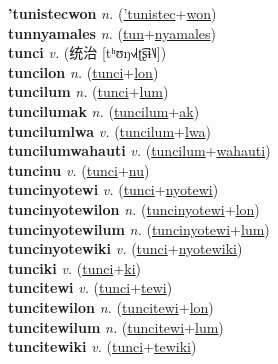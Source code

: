 \textbf{'tunistecwon} \textit{n.} (\hyperref['tunistec]{'tunistec}+\hyperref[won]{won})
 \label{'tunistecwon} \\
\textbf{tunnyamales} \textit{n.} (\hyperref[tun]{tun}+\hyperref[nyamales]{nyamales})
 \label{tunnyamales} \\
\textbf{tunci} \textit{v.} ({\chinese{}统治} [tʰʊŋ˧˩˧ʈ͡ʂɨ˥˩])
 \label{tunci} \\
\textbf{tuncilon} \textit{n.} (\hyperref[tunci]{tunci}+\hyperref[lon]{lon})
 \label{tuncilon} \\
\textbf{tuncilum} \textit{n.} (\hyperref[tunci]{tunci}+\hyperref[lum]{lum})
 \label{tuncilum} \\
\textbf{tuncilumak} \textit{n.} (\hyperref[tuncilum]{tuncilum}+\hyperref[ak]{ak})
 \label{tuncilumak} \\
\textbf{tuncilumlwa} \textit{v.} (\hyperref[tuncilum]{tuncilum}+\hyperref[lwa]{lwa})
 \label{tuncilumlwa} \\
\textbf{tuncilumwahauti} \textit{v.} (\hyperref[tuncilum]{tuncilum}+\hyperref[wahauti]{wahauti})
 \label{tuncilumwahauti} \\
\textbf{tuncinu} \textit{v.} (\hyperref[tunci]{tunci}+\hyperref[nu]{nu})
 \label{tuncinu} \\
\textbf{tuncinyotewi} \textit{v.} (\hyperref[tunci]{tunci}+\hyperref[nyotewi]{nyotewi})
 \label{tuncinyotewi} \\
\textbf{tuncinyotewilon} \textit{n.} (\hyperref[tuncinyotewi]{tuncinyotewi}+\hyperref[lon]{lon})
 \label{tuncinyotewilon} \\
\textbf{tuncinyotewilum} \textit{n.} (\hyperref[tuncinyotewi]{tuncinyotewi}+\hyperref[lum]{lum})
 \label{tuncinyotewilum} \\
\textbf{tuncinyotewiki} \textit{v.} (\hyperref[tunci]{tunci}+\hyperref[nyotewiki]{nyotewiki})
 \label{tuncinyotewiki} \\
\textbf{tunciki} \textit{v.} (\hyperref[tunci]{tunci}+\hyperref[ki]{ki})
 \label{tunciki} \\
\textbf{tuncitewi} \textit{v.} (\hyperref[tunci]{tunci}+\hyperref[tewi]{tewi})
 \label{tuncitewi} \\
\textbf{tuncitewilon} \textit{n.} (\hyperref[tuncitewi]{tuncitewi}+\hyperref[lon]{lon})
 \label{tuncitewilon} \\
\textbf{tuncitewilum} \textit{n.} (\hyperref[tuncitewi]{tuncitewi}+\hyperref[lum]{lum})
 \label{tuncitewilum} \\
\textbf{tuncitewiki} \textit{v.} (\hyperref[tunci]{tunci}+\hyperref[tewiki]{tewiki})
 \label{tuncitewiki} \\
